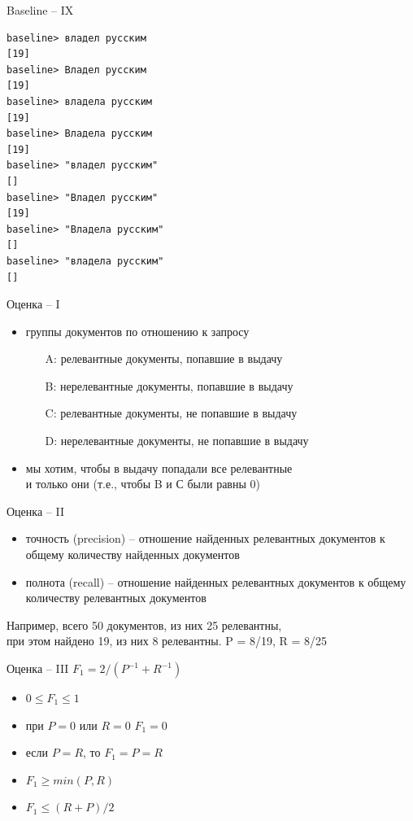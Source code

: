 \documentclass{beamer}
\begin{document}
\begin{frame}[fragile]{Baseline -- IX}
\begin{footnotesize}
\begin{verbatim}
baseline> владел русским
[19]
baseline> Владел русским
[19]
baseline> владела русским
[19]
baseline> Владела русским
[19]
baseline> "владел русским"
[]
baseline> "Владел русским"
[19]
baseline> "Владела русским"
[]
baseline> "владела русским"
[]
\end{verbatim}
\end{footnotesize}
\end{frame}

\begin{frame}{Оценка -- I}
\begin{itemize}
    \item группы документов по отношению к запросу
        \begin{itemize}
            \item[A:] релевантные документы, попавшие в выдачу
            \item[B:] нерелевантные документы, попавшие в выдачу
            \item[C:] релевантные документы, не попавшие в выдачу
            \item[D:] нерелевантные документы, не попавшие в выдачу
        \end{itemize}
    \item мы хотим, чтобы в выдачу попадали все релевантные \\и только они (т.е., чтобы B и С были равны 0)
\end{itemize}
\end{frame}

\begin{frame}{Оценка -- II}
\begin{itemize}
    \item точность (precision) -- отношение найденных релевантных документов к общему количеству найденных документов
    \item полнота (recall) -- отношение найденных релевантных документов к общему количеству релевантных документов
\end{itemize}
\medskip
Например, всего 50 документов, из них 25 релевантны, \\при этом найдено 19, из них 8 релевантны. P = 8/19, R = 8/25
\end{frame}

\begin{frame}{Оценка -- III}
$F_1 = 2/(P^{-1} + R^{-1})$\\
\medskip
\begin{itemize}
    \item $0 \leqslant F_1 \leqslant 1$
    \item при $P = 0$ или $R = 0$ $F_1 = 0$
    \item если $P = R$, то $F_1 = P = R$
    \item $F_1 \geqslant min(P, R)$
    \item $F_1 \leqslant (R+P)/2$
\end{itemize}
\end{frame}
\end{document}
